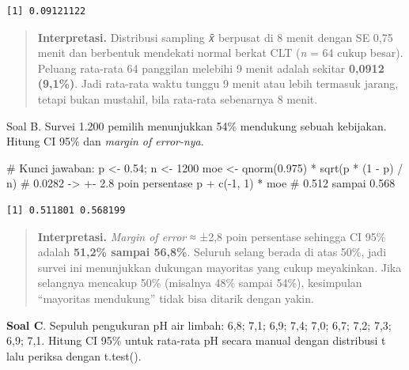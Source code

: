 \documentclass[
  indonesian,
  letterpaper,
]{book}
\newenvironment{Shaded}{\begin{snugshade}}{\end{snugshade}}
\newcommand{\CommentTok}[1]{\textcolor[rgb]{0.37,0.37,0.37}{#1}}
\newcommand{\DecValTok}[1]{\textcolor[rgb]{0.68,0.00,0.00}{#1}}
\newcommand{\FloatTok}[1]{\textcolor[rgb]{0.68,0.00,0.00}{#1}}
\newcommand{\FunctionTok}[1]{\textcolor[rgb]{0.28,0.35,0.67}{#1}}
\newcommand{\NormalTok}[1]{\textcolor[rgb]{0.00,0.23,0.31}{#1}}
\newcommand{\OtherTok}[1]{\textcolor[rgb]{0.00,0.23,0.31}{#1}}
\newcommand{\SpecialCharTok}[1]{\textcolor[rgb]{0.37,0.37,0.37}{#1}}
\begin{document}
\begin{verbatim}
[1] 0.09121122
\end{verbatim}

\begin{quote}
\textbf{Interpretasi.} Distribusi sampling 𝑥̄ berpusat di 8 menit dengan
SE 0,75 menit dan berbentuk mendekati normal berkat CLT (\emph{n} = 64
cukup besar). Peluang rata-rata 64 panggilan melebihi 9 menit adalah
sekitar \textbf{0,0912 (9,1\%)}. Jadi rata-rata waktu tunggu 9 menit
atau lebih termasuk jarang, tetapi bukan mustahil, bila rata-rata
sebenarnya 8 menit.
\end{quote}

Soal B. Survei 1.200 pemilih menunjukkan 54\% mendukung sebuah
kebijakan. Hitung CI 95\% dan \emph{margin of error-nya}.

\begin{Shaded}
\begin{Highlighting}[]
\CommentTok{\# Kunci jawaban:}
\NormalTok{p }\OtherTok{\textless{}{-}} \FloatTok{0.54}\NormalTok{; n }\OtherTok{\textless{}{-}} \DecValTok{1200}
\NormalTok{moe }\OtherTok{\textless{}{-}} \FunctionTok{qnorm}\NormalTok{(}\FloatTok{0.975}\NormalTok{) }\SpecialCharTok{*} \FunctionTok{sqrt}\NormalTok{(p }\SpecialCharTok{*}\NormalTok{ (}\DecValTok{1} \SpecialCharTok{{-}}\NormalTok{ p) }\SpecialCharTok{/}\NormalTok{ n) }\CommentTok{\# 0.0282 {-}\textgreater{} +{-} 2.8 poin persentase}
\NormalTok{p }\SpecialCharTok{+} \FunctionTok{c}\NormalTok{(}\SpecialCharTok{{-}}\DecValTok{1}\NormalTok{, }\DecValTok{1}\NormalTok{) }\SpecialCharTok{*}\NormalTok{ moe }\CommentTok{\# 0.512 sampai 0.568}
\end{Highlighting}
\end{Shaded}

\begin{verbatim}
[1] 0.511801 0.568199
\end{verbatim}

\begin{quote}
\textbf{Interpretasi.} \emph{Margin of error} ≈ ±2,8 poin persentase
sehingga CI 95\% adalah \textbf{51,2\% sampai 56,8\%}. Seluruh selang
berada di atas 50\%, jadi survei ini menunjukkan dukungan mayoritas yang
cukup meyakinkan. Jika selangnya mencakup 50\% (misalnya 48\% sampai
54\%), kesimpulan ``mayoritas mendukung'' tidak bisa ditarik dengan
yakin.
\end{quote}

\textbf{Soal C}. Sepuluh pengukuran pH air limbah: 6,8; 7,1; 6,9; 7,4;
7,0; 6,7; 7,2; 7,3; 6,9; 7,1. Hitung CI 95\% untuk rata-rata pH secara
manual dengan distribusi t lalu periksa dengan t.test().
\end{document}
